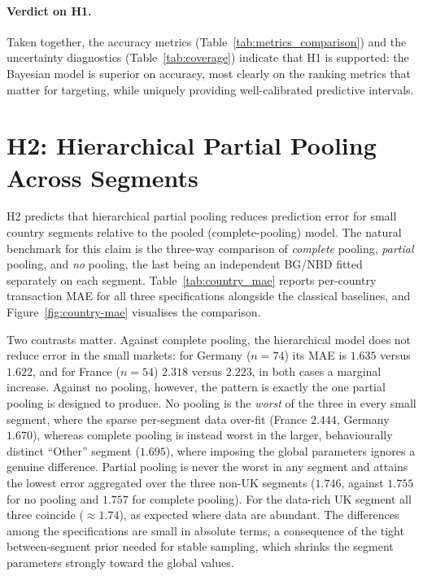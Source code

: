 
\paragraph{Verdict on H1.}
Taken together, the accuracy metrics (Table~\ref{tab:metrics_comparison}) and the uncertainty diagnostics (Table~\ref{tab:coverage}) indicate that H1 is supported: the Bayesian model is superior on accuracy, most clearly on the ranking metrics that matter for targeting, while uniquely providing well-calibrated predictive intervals.

\section{H2: Hierarchical Partial Pooling Across Segments}
\label{sec:results-h2}

H2 predicts that hierarchical partial pooling reduces prediction error for small country segments relative to the pooled (complete-pooling) model. The natural benchmark for this claim is the three-way comparison of \emph{complete} pooling, \emph{partial} pooling, and \emph{no} pooling, the last being an independent BG/NBD fitted separately on each segment. Table~\ref{tab:country_mae} reports per-country transaction MAE for all three specifications alongside the classical baselines, and Figure~\ref{fig:country-mae} visualises the comparison.

Two contrasts matter. Against complete pooling, the hierarchical model does not reduce error in the small markets: for Germany ($n=74$) its MAE is $1.635$ versus $1.622$, and for France ($n=54$) $2.318$ versus $2.223$, in both cases a marginal increase. Against no pooling, however, the pattern is exactly the one partial pooling is designed to produce. No pooling is the \emph{worst} of the three in every small segment, where the sparse per-segment data over-fit (France $2.444$, Germany $1.670$), whereas complete pooling is instead worst in the larger, behaviourally distinct ``Other'' segment ($1.695$), where imposing the global parameters ignores a genuine difference. Partial pooling is never the worst in any segment and attains the lowest error aggregated over the three non-UK segments ($1.746$, against $1.755$ for no pooling and $1.757$ for complete pooling). For the data-rich UK segment all three coincide ($\approx 1.74$), as expected where data are abundant. The differences among the specifications are small in absolute terms, a consequence of the tight between-segment prior needed for stable sampling, which shrinks the segment parameters strongly toward the global values.

